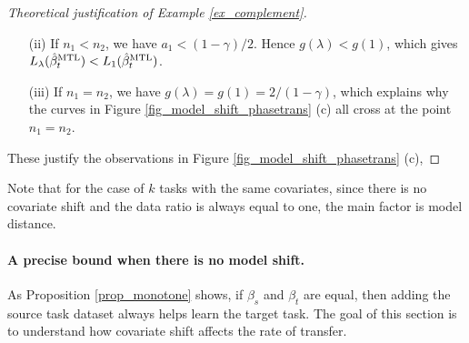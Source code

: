 \begin{proof}[Theoretical justification of Example \ref{ex_complement}]
\begin{itemize}
\item[(ii)] If $n_1< n_2$, we have $a_1< (1-\gamma)/2$. Hence $g(\lambda)< g(1)$, which gives $L_\lambda(\hat \beta_{t}^{\text{MTL}})<L_1(\hat \beta_{t}^{\text{MTL}})$. 

\item[(iii)] If $n_1=n_2$, we have $g(\lambda)=g(1)=2/(1-\gamma)$, which explains why the curves in Figure  \ref{fig_model_shift_phasetrans} (c) all cross at the point $n_1=n_2$.
\end{itemize}
These justify the observations in Figure \ref{fig_model_shift_phasetrans} (c), 
\end{proof}

\iffalse
Note that for the case of $k$ tasks with the same covariates, since there is no covariate shift and the data ratio is always equal to one, the main factor is model distance.

\paragraph{A precise bound when there is no model shift.}
As Proposition \ref{prop_monotone} shows, if $\beta_s$ and $\beta_t$ are equal, then adding the source task dataset always helps learn the target task.
The goal of this section is to understand how covariate shift affects the rate of transfer. 


